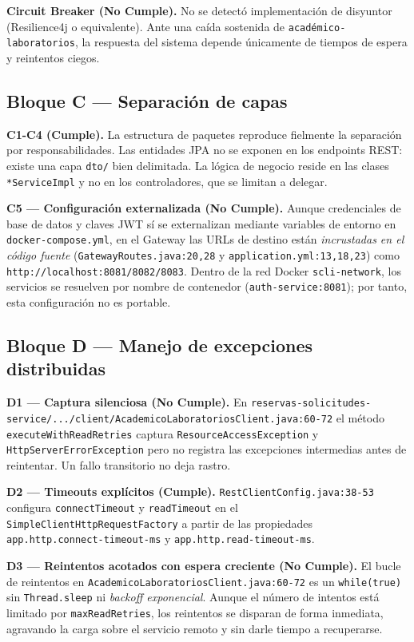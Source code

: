 \documentclass[11pt,a4paper]{article}
\begin{document}
\textbf{Circuit Breaker (No Cumple).} No se detectó implementación de disyuntor
(Resilience4j o equivalente). Ante una caída sostenida de
\texttt{académico-laboratorios}, la respuesta del sistema depende únicamente
de tiempos de espera y reintentos ciegos.

\subsection{Bloque C --- Separación de capas}

\textbf{C1-C4 (Cumple).} La estructura de paquetes reproduce fielmente la
separación por responsabilidades. Las entidades JPA no se exponen en los
endpoints REST: existe una capa \texttt{dto/} bien delimitada. La lógica de
negocio reside en las clases \texttt{*ServiceImpl} y no en los controladores,
que se limitan a delegar.

\textbf{C5 --- Configuración externalizada (No Cumple).} Aunque credenciales de
base de datos y claves JWT sí se externalizan mediante variables de entorno
en \texttt{docker-compose.yml}, en el Gateway las URLs de destino están
\emph{incrustadas en el código fuente}
(\texttt{GatewayRoutes.java:20,28} y \texttt{application.yml:13,18,23}) como
\texttt{http://localhost:8081/8082/8083}. Dentro de la red Docker
\texttt{scli-network}, los servicios se resuelven por nombre de contenedor
(\texttt{auth-service:8081}); por tanto, esta configuración no es portable.

\subsection{Bloque D --- Manejo de excepciones distribuidas}

\textbf{D1 --- Captura silenciosa (No Cumple).} En
\texttt{reservas-solicitudes-service/.../client/AcademicoLaboratoriosClient.java:60-72}
el método \texttt{executeWithReadRetries} captura
\texttt{ResourceAccessException} y \texttt{HttpServerErrorException} pero no
registra las excepciones intermedias antes de reintentar. Un fallo transitorio
no deja rastro.

\textbf{D2 --- Timeouts explícitos (Cumple).}
\texttt{RestClientConfig.java:38-53} configura \texttt{connectTimeout} y
\texttt{readTimeout} en el \texttt{SimpleClientHttpRequestFactory} a partir de
las propiedades \texttt{app.http.connect-timeout-ms} y
\texttt{app.http.read-timeout-ms}.

\textbf{D3 --- Reintentos acotados con espera creciente (No Cumple).} El bucle
de reintentos en \texttt{AcademicoLaboratoriosClient.java:60-72} es un
\texttt{while(true)} sin \texttt{Thread.sleep} ni \emph{backoff exponencial}.
Aunque el número de intentos está limitado por \texttt{maxReadRetries}, los
reintentos se disparan de forma inmediata, agravando la carga sobre el
servicio remoto y sin darle tiempo a recuperarse.
\end{document}
